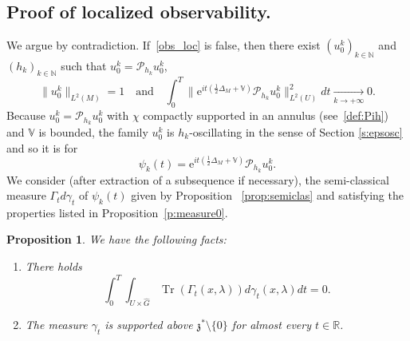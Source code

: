 \documentclass[JEP,XML,SOM,Unicode,published]{cedram}
\let\mathcal\mathscr
\newcommand{\rme}{\mathrm{e}}
\DeclareMathOperator{\Tr}{Tr}
\theoremstyle{plain}
\newtheorem{proposition}[theorem]{Proposition}
\theoremstyle{definition}
\def\R{{\mathbb R}}
\def\N{{\mathbb N}}
\def\bbV{{\mathbb V}}
\newcommand{\Tend}[2]{\mathbin{\mathop{\longrightarrow}\limits_{#1\to#2}}}
\begin{document}
\subsection{Proof of localized observability.}\label{sec:proof}

We argue by contradiction. If~\eqref{obs_loc} is false, then there exist $(u_0^k)_{k\in\N}$ and $(h_k)_{k\in\N}$ such that $u_0^k= \mathcal{P}_{h_k} u_0^k$,
\begin{equation}\label{hyp}
\| u^k_0\|_{L^2(M)}=1\quad \mbox{and}\quad \int_0^T \bigl\| \rme^{it(\frac12 \Delta_M+\bbV)} \mathcal{P}_{h_k} u_0^k\bigr\|_{L^2(U)}^2 dt\Tend{k}{ +\infty} 0.
\end{equation}
Because $u_0^k= \mathcal{P}_{h_k} u_0^k$ with $\chi$ compactly supported in an annulus (see~\eqref{def:Pih}) and $\bbV$ is bounded, the family $u_0^k$ is
$h_k$-oscillating in the sense of Section \ref{s:epsosc}
and so it is for
\[
\psi_k(t)= \rme^{it(\frac12 \Delta_M+\bbV)} \mathcal{P}_{h_k} u_0^k.
\]
We consider (after extraction of a subsequence if necessary), the semi-classical measure $\Gamma_t d\gamma_t$ of $\psi_k(t)$ given by Proposition~ \ref{prop:semiclas} and satisfying the properties listed in Proposition~\ref{p:measure0}.

\begin{proposition}\label{p:pmeasure}
We have the following facts:
\begin{enumerate}
\item\label{p:pmeasure1}
There holds
\begin{equation} \label{e:nullityoverU}
\int_0^T \int_{U\times \widehat G} \Tr (\Gamma_t(x,\lambda)) d\gamma_t (x,\lambda)dt=0.
\end{equation}
\item\label{p:pmeasure2} The measure $\gamma_t$ is supported above $\mathfrak z^*\setminus \{0\}$ for almost every $t\in\R$.
\end{enumerate}
\end{proposition}
\end{document}
